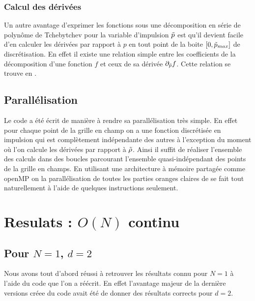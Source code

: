 \documentclass[10pt]{article}
\begin{document}
\begin{multicols}{2}
\subsubsection{Calcul des dérivées}

Un autre avantage d'exprimer les fonctions sous une décomposition en série de polynôme de Tchebytchev pour la variable d'impulsion $\tilde{p}$ est qu'il devient facile d'en calculer les dérivées par rapport à $p$ en tout point de la boite $[0, \tilde{p}_{max}]$ de discrétisation. En effet il existe une relation simple entre les coefficients de la décomposition d'une fonction $f$ et ceux de sa dérivée $\partial_{\tilde{p}} f$. Cette relation se trouve en . \\


\subsection{Parallélisation}


Le code a été écrit de manière à rendre sa parallélisation très simple. En effet pour chaque point de la grille en champ on a une fonction discrétisée en impulsion qui est complètement indépendante des autres à l'exception du moment où l'on calcule les dérivées par rapport à $\tilde{\rho}$. Ainsi il suffit de réaliser l'ensemble des calculs dans des boucles parcourant l'ensemble quasi-indépendant des points de la grille en champs. En utilisant une architecture à mémoire partagée comme openMP on la parallélisation de toutes les parties oranges claires de  se fait tout naturellement à l'aide de quelques instructions seulement. 



\section{Resulats : $O(N)$ continu}

\subsection{Pour $N = 1$, $d=2$}

Nous avons tout d'abord réussi à retrouver les résultats connu pour $N=1$ à l'aide du code que l'on a réécrit. En effet l'avantage majeur de la dernière versions créee du code avait été de donner des résultats corrects pour $d = 2$.


\end{multicols}
\end{document}
